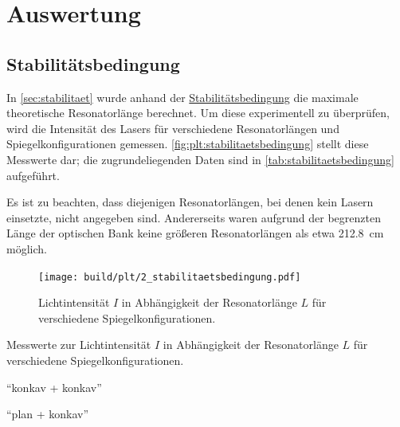 \section{Auswertung}
\label{sec:auswertung}

\subsection{Stabilitätsbedingung}
\label{sec:auswertung:stabilitaetsbedingung}

In \autoref{sec:stabilitaet} wurde anhand der \hyperref[eqn:stabilitaetsbedingung]{Stabilitätsbedingung} die maximale theoretische Resonatorlänge berechnet.
Um diese experimentell zu überprüfen,
wird die Intensität des Lasers für verschiedene Resonatorlängen und Spiegelkonfigurationen gemessen.
\autoref{fig:plt:stabilitaetsbedingung} stellt diese Messwerte dar; die zugrundeliegenden Daten sind in \autoref{tab:stabilitaetsbedingung} aufgeführt.

Es ist zu beachten, dass diejenigen Resonatorlängen, bei denen kein Lasern einsetzte, nicht angegeben sind.
Andererseits waren aufgrund der begrenzten Länge der optischen Bank keine größeren Resonatorlängen als etwa \SI{212.8}{\centi\meter} möglich.

\begin{figure}
  \centering
   \texttt{[image: build/plt/2\_stabilitaetsbedingung.pdf]}
   \caption{Lichtintensität $I$ in Abhängigkeit der Resonatorlänge $L$ für verschiedene Spiegelkonfigurationen.}
   \label{fig:plt:stabilitaetsbedingung}
\end{figure}

\begin{table}
\centering
\caption{Messwerte zur Lichtintensität $I$ in Abhängigkeit der Resonatorlänge $L$ für verschiedene Spiegelkonfigurationen.}
\label{tab:stabilitaetsbedingung}
\begin{subtable}{.5\textwidth}
    \centering
    \caption{\enquote{konkav + konkav}}
\end{subtable}%
\begin{subtable}{.5\textwidth}
    \centering
    \caption{\enquote{plan + konkav}}
\end{subtable}
\end{table}


